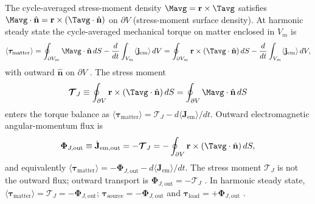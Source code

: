The cycle-averaged stress-moment density $\Mavg=\mathbf{r}\times\Tavg$ satisfies
$\Mavg\cdot\hat{\mathbf{n}}=\mathbf{r}\times(\Tavg\cdot\hat{\mathbf{n}})$ on $\partial V$ (stress-moment surface density).
At harmonic steady state the cycle-averaged mechanical torque on matter enclosed in $V_m$ is
\begin{equation}
\label{eq:ch1.torque-stress-surface}
\langle\boldsymbol{\tau}_{\mathrm{matter}}\rangle
=\oint_{\partial V_m}\Mavg\cdot\hat{\mathbf{n}}\,dS
-\frac{d}{dt}\int_{V_m} \langle\mathbf{j}_{\mathrm{em}}\rangle\,dV
=\oint_{\partial V_m}\mathbf{r}\times(\Tavg\cdot\hat{\mathbf{n}})\,dS
-\frac{d}{dt}\int_{V_m} \langle\mathbf{j}_{\mathrm{em}}\rangle\,dV,
\end{equation}
with outward $\hat{\mathbf{n}}$ on $\partial V$ \cite{beth1936,stratton1941}. The stress moment
\begin{equation}
\label{eq:ch1.stress-moment-integral}
\boldsymbol{\mathcal{T}}_J
\equiv
\oint_{\partial V}\mathbf{r}\times(\Tavg\cdot\hat{\mathbf{n}})\,dS
=\oint_{\partial V}\Mavg\cdot\hat{\mathbf{n}}\,dS
\end{equation}
enters the torque balance as $\langle\boldsymbol{\tau}_{\mathrm{matter}}\rangle=\boldsymbol{\mathcal{T}}_J-d\langle\mathbf{J}_{\mathrm{em}}\rangle/dt$. Outward electromagnetic angular-momentum flux is
\begin{equation}
\label{eq:ch1.outward-am-flux}
\boldsymbol{\Phi}_{J,\mathrm{out}}
\equiv
\dot{\mathbf{J}}_{\mathrm{em,out}}
=-\boldsymbol{\mathcal{T}}_J
=-\oint_{\partial V}\mathbf{r}\times(\Tavg\cdot\hat{\mathbf{n}})\,dS,
\end{equation}
and equivalently $\langle\boldsymbol{\tau}_{\mathrm{matter}}\rangle=-\boldsymbol{\Phi}_{J,\mathrm{out}}-d\langle\mathbf{J}_{\mathrm{em}}\rangle/dt$. The stress moment $\boldsymbol{\mathcal{T}}_J$ is not the outward flux; outward transport is $\boldsymbol{\Phi}_{J,\mathrm{out}}=-\boldsymbol{\mathcal{T}}_J$ \cite{stratton1941,beth1936}. In harmonic steady state, $\langle\boldsymbol{\tau}_{\mathrm{matter}}\rangle=\boldsymbol{\mathcal{T}}_J=-\boldsymbol{\Phi}_{J,\mathrm{out}}$; $\boldsymbol{\tau}_{\mathrm{source}}=-\boldsymbol{\Phi}_{J,\mathrm{out}}$ and $\boldsymbol{\tau}_{\mathrm{load}}=+\boldsymbol{\Phi}_{J,\mathrm{out}}$ \cite{beth1936}.

